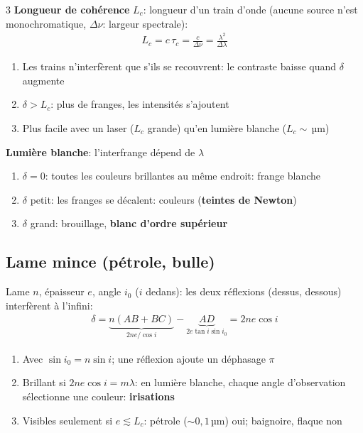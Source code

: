 \documentclass[12pt, a4paper]{article}
\begin{document}
\begin{multicols*}{3}
	\textbf{Longueur de cohérence} $L_c$: longueur d'un train d'onde (aucune source n'est monochromatique, $\Delta\nu$: largeur spectrale):
	\begin{gather*}
		L_c=c\,\tau_c=\frac{c}{\Delta\nu}=\frac{\lambda^2}{\Delta\lambda}
	\end{gather*}
	\begin{enumerate}[\roman*.]
		\item Les trains n'interfèrent que s'ils se recouvrent: le contraste baisse quand $\delta$ augmente
		\item $\delta>L_c$: plus de franges, les intensités s'ajoutent
		\item Plus facile avec un laser ($L_c$ grande) qu'en lumière blanche ($L_c\sim$\,µm)
	\end{enumerate}

	\colbreak
	\textbf{Lumière blanche}: l'interfrange dépend de $\lambda$
	\begin{enumerate}[\roman*.]
		\item $\delta=0$: toutes les couleurs brillantes au même endroit: frange blanche
		\item $\delta$ petit: les franges se décalent: couleurs (\textbf{teintes de Newton})
		\item $\delta$ grand: brouillage, \textbf{blanc d'ordre supérieur}
	\end{enumerate}

	\subsection{Lame mince (pétrole, bulle)}
	Lame $n$, épaisseur $e$, angle $i_0$ ($i$ dedans): les deux réflexions (dessus, dessous) interfèrent à l'infini:
	\begin{gather*}
		\delta=\underbrace{n(AB+BC)}_{2ne/\cos i}-\underbrace{AD}_{2e\tan i\sin i_0}=2ne\cos i
	\end{gather*}
	\begin{enumerate}[\roman*.]
		\item Avec $\sin i_0=n\sin i$; une réflexion ajoute un déphasage $\pi$
		\item Brillant si $2ne\cos i=m\lambda$: en lumière blanche, chaque angle d'observation sélectionne une couleur: \textbf{irisations}
		\item Visibles seulement si $e\lesssim L_c$: pétrole ($\sim0{,}1$\,µm) oui; baignoire, flaque non
	\end{enumerate}


\end{multicols*}
\end{document}
